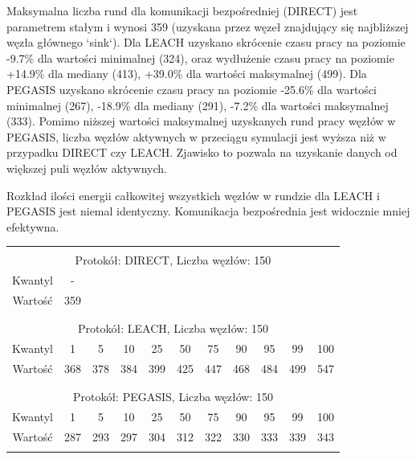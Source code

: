 \documentclass[a4paper,12pt,twoside,openany]{report}
\begin{document}
\par
Maksymalna liczba rund dla komunikacji bezpośredniej (DIRECT) jest parametrem stałym i wynosi 359 (uzyskana przez węzeł znajdujący się najbliższej węzła głównego `sink`).
Dla LEACH uzyskano skrócenie czasu pracy na poziomie -9.7\% dla wartości minimalnej (324), oraz wydłużenie czasu pracy na poziomie +14.9\% dla mediany (413), +39.0\% dla wartości maksymalnej (499).
Dla PEGASIS uzyskano skrócenie czasu pracy na poziomie -25.6\% dla wartości minimalnej (267), -18.9\% dla mediany (291), -7.2\% dla wartości maksymalnej (333).
Pomimo niższej wartości maksymalnej uzyskanych rund pracy węzłów w PEGASIS, liczba węzłów aktywnych w przeciągu symulacji jest wyższa niż w przypadku DIRECT czy LEACH.
Zjawisko to pozwala na uzyskanie danych od większej puli węzłów aktywnych.
\par
Rozkład ilości energii całkowitej wszystkich węzłów w rundzie dla LEACH i PEGASIS jest niemal identyczny. Komunikacja bezpośrednia jest widocznie mniej efektywna.

\begin{longtable}{*{11}{c}}
\toprule \\*
\multicolumn{11}{c}{Protokół: DIRECT, Liczba węzłów: 150} \\*
Kwantyl	& -	\\*
Wartość	& 359	\\*
\midrule \\*
\\*
\multicolumn{11}{c}{Protokół: LEACH, Liczba węzłów: 150} \\*
Kwantyl	& 1	& 5	& 10	& 25	& 50	& 75	& 90	& 95	& 99	& 100	\\*
Wartość	& 368	& 378	& 384	& 399	& 425	& 447	& 468	& 484	& 499	& 547	\\*
\midrule \\*
\\*
\multicolumn{11}{c}{Protokół: PEGASIS, Liczba węzłów: 150} \\*
Kwantyl	& 1	& 5	& 10	& 25	& 50	& 75	& 90	& 95	& 99	& 100	\\*
Wartość	& 287	& 293	& 297	& 304	& 312	& 322	& 330	& 333	& 339	& 343	\\*
\bottomrule \\*
\end{longtable}
\end{document}
